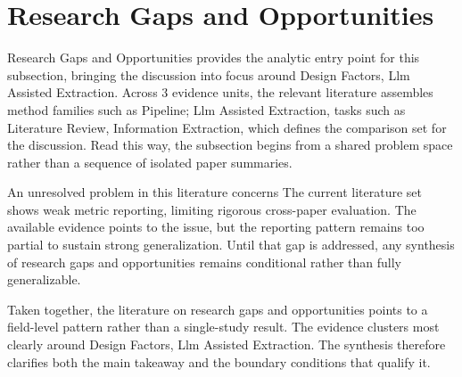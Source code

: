 \documentclass{article}
\begin{document}
\section{Research Gaps and Opportunities}
Research Gaps and Opportunities provides the analytic entry point for this subsection, bringing the discussion into focus around Design Factors, Llm Assisted Extraction. Across 3 evidence units, the relevant literature assembles method families such as Pipeline; Llm Assisted Extraction, tasks such as Literature Review, Information Extraction, which defines the comparison set for the discussion. Read this way, the subsection begins from a shared problem space rather than a sequence of isolated paper summaries. \cite{02_2003_brosseau_trf,01_2001_hamed_safety_science}

An unresolved problem in this literature concerns The current literature set shows weak metric reporting, limiting rigorous cross-paper evaluation. The available evidence points to the issue, but the reporting pattern remains too partial to sustain strong generalization. Until that gap is addressed, any synthesis of research gaps and opportunities remains conditional rather than fully generalizable. \cite{02_2003_brosseau_trf,01_2001_hamed_safety_science}

Taken together, the literature on research gaps and opportunities points to a field-level pattern rather than a single-study result. The evidence clusters most clearly around Design Factors, Llm Assisted Extraction. The synthesis therefore clarifies both the main takeaway and the boundary conditions that qualify it. \cite{02_2003_brosseau_trf,01_2001_hamed_safety_science}
\end{document}
